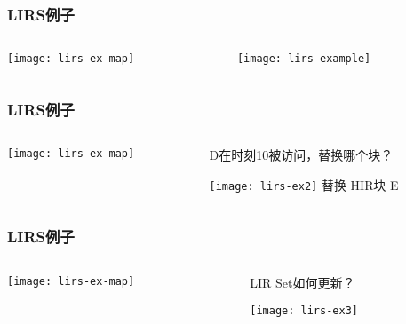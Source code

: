 \begin{frame}[plain]
	\frametitle{LIRS例子}
	\begin{columns}
		\begin{column}{.4\textwidth}
			\centering
				\texttt{[image: lirs-ex-map]}
		\end{column}
		
		\begin{column}{.6\textwidth}
			
		\texttt{[image: lirs-example]}
			
		\end{column}
		
		
	\end{columns}
\end{frame}


\begin{frame}[plain]
	\frametitle{LIRS例子}
	\begin{columns}
		\begin{column}{.4\textwidth}
			\centering
			\texttt{[image: lirs-ex-map]}
		\end{column}
		
		\begin{column}{.6\textwidth}
			D在时刻10被访问，替换哪个块？
			
			\texttt{[image: lirs-ex2]}
			\pause
			\centering
			替换 HIR块 E	
		\end{column}
		
		
	\end{columns}
\end{frame}




\begin{frame}[plain]
	\frametitle{LIRS例子}
	\begin{columns}
		\begin{column}{.4\textwidth}
			\centering
			\texttt{[image: lirs-ex-map]}
		\end{column}
		
		\begin{column}{.6\textwidth}
			LIR Set如何更新？
			
			\texttt{[image: lirs-ex3]}
			

		\end{column}
		
		
	\end{columns}
\end{frame}


